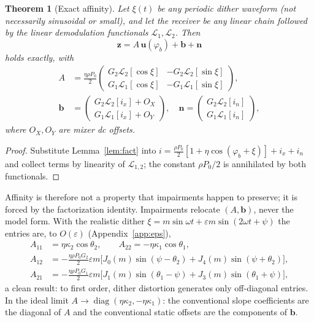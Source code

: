 \documentclass[journal]{IEEEtran}
\newtheorem{theorem}{Theorem}
\newcommand{\zv}{\mathbf{z}}
\newcommand{\uv}{\mathbf{u}}
\newcommand{\bv}{\mathbf{b}}
\newcommand{\nv}{\mathbf{n}}
\newcommand{\Lc}{\mathcal{L}}
\begin{document}
\begin{theorem}[Exact affinity]
\label{th:affine}
Let $\xi(t)$ be any periodic dither waveform (not necessarily
sinusoidal or small), and let the receiver be any linear chain followed
by the linear demodulation functionals $\Lc_1,\Lc_2$. Then
\begin{equation}
\boxed{\;\zv=A\,\uv(\varphi_b)+\bv+\nv\;}
\label{eq:affine}
\end{equation}
holds exactly, with
\begin{align}
A&=\frac{\eta\rho P_0}{2}
\begin{pmatrix}
G_2\Lc_2[\cos\xi] & -G_2\Lc_2[\sin\xi]\\
G_1\Lc_1[\cos\xi] & -G_1\Lc_1[\sin\xi]
\end{pmatrix},\nonumber\\
\bv&=\begin{pmatrix}G_2\Lc_2[i_x]+O_X\\ G_1\Lc_1[i_x]+O_Y\end{pmatrix},\quad
\nv=\begin{pmatrix}G_2\Lc_2[i_n]\\ G_1\Lc_1[i_n]\end{pmatrix},
\label{eq:entries}
\end{align}
where $O_X,O_Y$ are mixer dc offsets.
\end{theorem}
\begin{proof}
Substitute Lemma~\ref{lem:fact} into
$i=\tfrac{\rho P_0}{2}[1+\eta\cos(\varphi_b+\xi)]+i_x+i_n$ and collect
terms by linearity of $\Lc_{1,2}$; the constant $\rho P_0/2$ is
annihilated by both functionals.
\end{proof}

Affinity is therefore not a property that impairments happen to
preserve; it is forced by the factorization identity. Impairments
relocate $(A,\bv)$, never the model form. With the realistic dither
$\xi=m\sin\omega t+\varepsilon m\sin(2\omega t+\psi)$ the entries are,
to $O(\varepsilon)$ (Appendix~\ref{app:eps}),
\begin{align}
A_{11}&=\eta\kappa_2\cos\theta_2, \qquad A_{22}=-\eta\kappa_1\cos\theta_1,\nonumber\\
A_{12}&=-\tfrac{\eta\rho P_0G_2}{2}\varepsilon m
\bigl[J_0(m)\sin(\psi{-}\theta_2)+J_4(m)\sin(\psi{+}\theta_2)\bigr],\nonumber\\
A_{21}&=-\tfrac{\eta\rho P_0G_1}{2}\varepsilon m
\bigl[J_1(m)\sin(\theta_1{-}\psi)+J_3(m)\sin(\theta_1{+}\psi)\bigr],
\label{eq:Aeps}
\end{align}
a clean result: to first order, dither distortion generates only
off-diagonal entries. In the ideal limit
$A\to\operatorname{diag}(\eta\kappa_2,-\eta\kappa_1)$: the
conventional slope coefficients are the diagonal of $A$ and the
conventional static offsets are the components of $\bv$.
\end{document}
